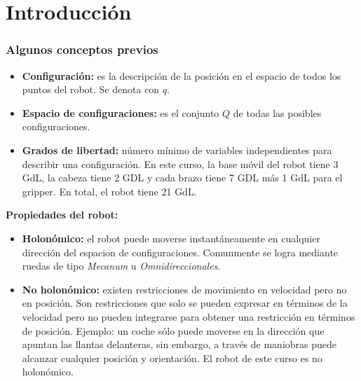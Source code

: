 \section{Introducción}

\begin{frame}\frametitle{Algunos conceptos previos}
    \begin{itemize}
  \item \textbf{Configuración:} es la descripción de la posición en el espacio de todos los puntos del robot. Se denota con $q$.
  \item \textbf{Espacio de configuraciones:} es el conjunto $Q$ de todas las posibles configuraciones. 
  \item \textbf{Grados de libertad:} número mínimo de variables independientes para describir una configuración. En este curso, la base móvil del robot tiene 3 GdL, la cabeza tiene 2 GDL y cada brazo tiene 7 GDL más 1 GdL para el gripper. En total, el robot tiene 21 GdL. 
  \end{itemize}
  \textbf{Propiedades del robot:}
  \begin{itemize}
  \item \textbf{Holonómico:} el robot puede moverse instantáneamente en cualquier dirección del espacion de configuraciones. Comunmente se logra mediante ruedas de tipo \textit{Mecanum} u \textit{Omnidireccionales}. 
  \item \textbf{No holonómico:} existen restricciones de movimiento en velocidad pero no en posición. Son restricciones que solo se pueden expresar en términos de la velocidad pero no pueden integrarse para obtener una restricción en términos de posición. Ejemplo: un coche sólo puede moverse en la dirección que apuntan las llantas delanteras, sin embargo, a través de maniobras puede alcanzar cualquier posición y orientación. El robot de este curso es no holonómico. 
  \end{itemize}
\end{frame}

